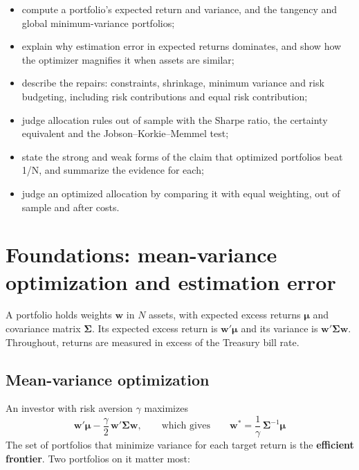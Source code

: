 \begin{itemize}
  \item compute a portfolio's expected return and variance, and the tangency and global minimum-variance portfolios;
  \item explain why estimation error in expected returns dominates, and show how the optimizer magnifies it when assets are similar;
  \item describe the repairs: constraints, shrinkage, minimum variance and risk budgeting, including risk contributions and equal risk contribution;
  \item judge allocation rules out of sample with the Sharpe ratio, the certainty equivalent and the Jobson--Korkie--Memmel test;
  \item state the strong and weak forms of the claim that optimized portfolios beat 1/N, and summarize the evidence for each;
  \item judge an optimized allocation by comparing it with equal weighting, out of sample and after costs.
\end{itemize}

\section{Foundations: mean-variance optimization and estimation error}
\label{sec:19-foundations}

A portfolio holds weights $\mathbf{w}$ in $N$ assets, with expected excess returns $\boldsymbol{\mu}$ and covariance matrix $\boldsymbol{\Sigma}$. Its expected excess return is $\mathbf{w}'\boldsymbol{\mu}$ and its variance is $\mathbf{w}'\boldsymbol{\Sigma}\mathbf{w}$. Throughout, returns are measured in excess of the Treasury bill rate.

\subsection{Mean-variance optimization}

An investor with risk aversion $\gamma$ maximizes
\begin{equation}
  \mathbf{w}'\boldsymbol{\mu} - \frac{\gamma}{2}\,\mathbf{w}'\boldsymbol{\Sigma}\mathbf{w}, \qquad \text{which gives} \qquad \mathbf{w}^* = \frac{1}{\gamma}\,\boldsymbol{\Sigma}^{-1}\boldsymbol{\mu}
  \label{eq:19-mv}
\end{equation}
The set of portfolios that minimize variance for each target return is the \textbf{efficient frontier}. Two portfolios on it matter most:

